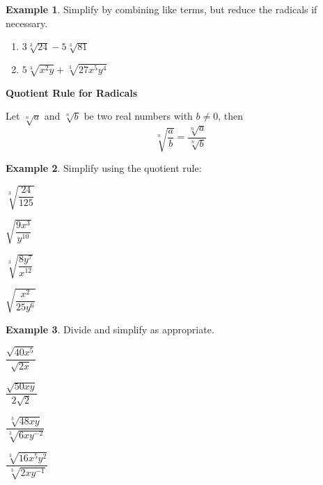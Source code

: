 \documentclass[addpoints,12pt]{exam}
\theoremstyle{definition}
\newtheorem{example}{Example}[subsection]
\begin{document}
\begin{example}
Simplify by combining like terms, but reduce the radicals if necessary.

\begin{enumerate}
\item $3\sqrt[3]{24} - 5\sqrt[3]{81}$
\vspace{1.25in}
\item $5\sqrt[3]{x^2y} + \sqrt[3]{27x^5y^4}$
\vspace{1.25in}
\end{enumerate}
\end{example}

\begin{mdframed}
\textbf{Quotient Rule for Radicals}

Let $\sqrt[n]{a}$ and $\sqrt[n]{b}$ be two real numbers with $b\neq 0$, then \[\sqrt[n]{\dfrac{a}{b}} = \dfrac{\sqrt[n]{a}}{\sqrt[n]{b}}\]
\end{mdframed}

\vspace{.15in}

\begin{example}
Simplify using the quotient rule:
\begin{enumerate}
\begin{minipage}{.5\textwidth}
\item $\sqrt[3]{\dfrac{24}{125}}$
\vspace{1.05in}
\item $\sqrt{\dfrac{9x^3}{y^{10}}}$
\vspace{1.05in}
\end{minipage}%
\begin{minipage}{.5\textwidth}
\item $\sqrt[3]{\dfrac{8y^7}{x^{12}}}$
\vspace{1.05in}
\item $\sqrt{\dfrac{x^2}{25y^6}}$
\vspace{1.05in}
\end{minipage}%
\end{enumerate}
\end{example}

\begin{example}
Divide and simplify as appropriate.
\begin{enumerate}
\begin{minipage}{.5\textwidth}
\item $\dfrac{\sqrt{40x^5}}{\sqrt{2x}}$
\vspace{1.15in}
\item $\dfrac{\sqrt{50xy}}{2\sqrt{2}}$
\end{minipage}%
\begin{minipage}{.5\textwidth}
\item $\dfrac{\sqrt[3]{48xy}}{\sqrt[3]{6xy^{-2}}}$
\vspace{1.15in}
\item $\dfrac{\sqrt[3]{16x^5y^2}}{\sqrt[3]{2xy^{-1}}}$
\end{minipage}%
\end{enumerate}
\end{example}
\end{document}
